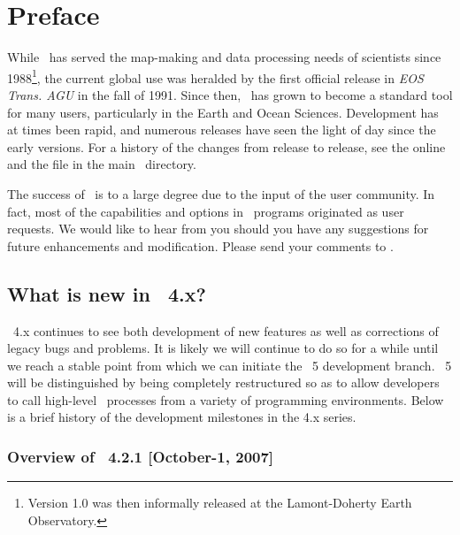 %
%
\chapter{Preface} 
\label{ch:1}
\thispagestyle{headings}

While \GMT\ has served the map-making and data processing needs of scientists since 1988\footnote{Version
1.0 was then informally released at the Lamont-Doherty Earth Observatory.}, the current global use was
heralded by the first official release in {\it EOS Trans. AGU} in the fall of 1991.  Since then,
\GMT\ has grown to become a standard tool for many users, particularly in the Earth and Ocean Sciences.
Development has at times been rapid, and numerous releases have seen the light of day since the early
versions.  For a history of the changes from release to release, see the online
and the file  in the main \GMT\ directory.

The success of \GMT\ is to a large degree due to the input of the user community. In fact, most of the
capabilities and options in \GMT\ programs originated as user requests.
We would like to hear from you should you have any suggestions for future enhancements and modification.
Please send your comments to
.

\section{What is new in \gmt\ 4.x?}

\GMT\ 4.x continues to see both development of new features as well as corrections of
legacy bugs and problems.  It is likely we will continue to do so for a while until we
reach a stable point from which we can initiate the \GMT\ 5 development branch.  \GMT\ 5
will be distinguished by being completely restructured so as to allow developers to call
high-level \GMT\ processes from a variety of programming environments.  Below is a brief
history of the development milestones in the 4.x series.

\subsection{Overview of \gmt\ 4.2.1 [October-1, 2007]}

